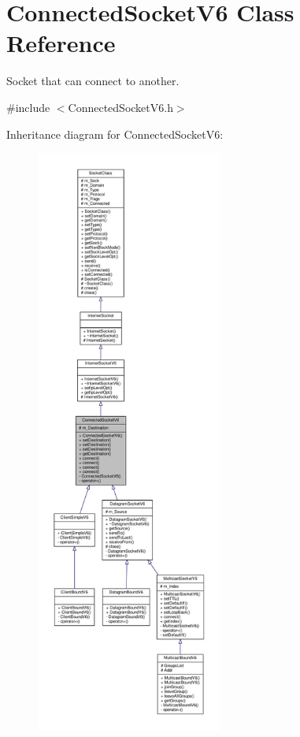 \hypertarget{classConnectedSocketV6}{}\section{Connected\+Socket\+V6 Class Reference}
\label{classConnectedSocketV6}


Socket that can connect to another.  




{\ttfamily \#include $<$Connected\+Socket\+V6.\+h$>$}



Inheritance diagram for Connected\+Socket\+V6\+:\nopagebreak
\begin{figure}[H]
\begin{center}
\leavevmode
\includegraphics[height=550pt]{classConnectedSocketV6__inherit__graph}
\end{center}
\end{figure}
